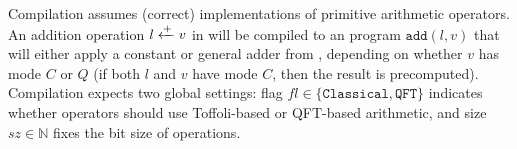 
Compilation assumes (correct) \vqir implementations of primitive arithmetic operators. 
An addition operation ${l} \xleftarrow{+} {v}$ in \vqimp will be compiled to an \vqir program $\texttt{add}(l,v)$ that will either apply a constant or general adder from , depending on whether $v$ has mode $C$ or $Q$ (if both $l$ and $v$ have mode $C$, then the result is precomputed).
Compilation expects two global settings: flag $fl \in \{\texttt{Classical}, \texttt{QFT}\}$ indicates whether \vqir operators should use Toffoli-based or QFT-based arithmetic, and size $sz \in \mathbb{N}$ fixes the bit size of operations.



